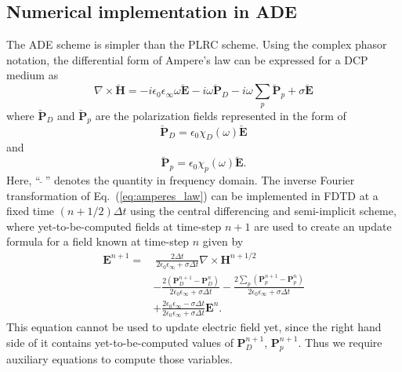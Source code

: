 \subsection{Numerical implementation in ADE}
The ADE scheme is simpler than the PLRC scheme. Using the complex phasor notation, the differential form of Ampere's law can be expressed for a DCP medium as
\begin{equation}
\nabla \times \breve{\mathbf H} = -i \epsilon_0 \epsilon_\infty \omega \breve{\mathbf E} - i \omega \breve{\mathbf P}_D - i \omega \sum_p \breve {\mathbf P}_p + \sigma \breve{\mathbf E}
\label{eq:amperes_law}
\end{equation}
where $\breve{\mathbf P}_D$ and $\breve{\mathbf P}_p$ are the polarization fields represented in the form of
\begin{equation}
\breve{\mathbf P}_D = \epsilon_0 \chi_D(\omega) \breve{\mathbf E}
\label{eq:dispersion_current_dp}
\end{equation}
and
\begin{equation}
\breve{\mathbf P}_p = \epsilon_0 \chi_p(\omega) \breve{\mathbf E}.
\label{eq:dispersion_current_cp}
\end{equation}
Here, ``$\breve{~~}$'' denotes the quantity in frequency domain. The inverse Fourier transformation of Eq.~(\ref{eq:amperes_law}) can be implemented in FDTD at a fixed time $(n + 1/2) \Delta t$ using the central differencing and semi-implicit scheme, where yet-to-be-computed fields at time-step $n+1$ are used to create an update formula for a field known at time-step $n$ given by
\begin{equation}
\begin{split}
\mathbf{E}^{n+1} =& ~ \frac{2 \Delta t}{2 \epsilon_0 \epsilon_\infty + \sigma \Delta t} \nabla \times \mathbf{H}^{n+1/2}\\
& - \frac{2 \left ( \mathbf{P}_D^{n+1}- \mathbf{P}_D^n \right)}{2 \epsilon_0 \epsilon_\infty + \sigma \Delta t} - \frac{2 \sum_p \left( \mathbf{P}_p^{n+1} - \mathbf{P}_p^n \right)}{2 \epsilon_0 \epsilon_\infty + \sigma \Delta t}\\
& + \frac{2 \epsilon_0 \epsilon_\infty - \sigma \Delta t}{2 \epsilon_0 \epsilon_\infty + \sigma \Delta t} \mathbf{E}^n.
\label{eq:e_update_ade_tmp}
\end{split}
\end{equation}
This equation cannot be used to update electric field yet, since the right hand side of it contains yet-to-be-computed values of $\mathbf{P}_D^{n+1}$, $\mathbf{P}_p^{n+1}$. Thus we require auxiliary equations to compute those variables.

